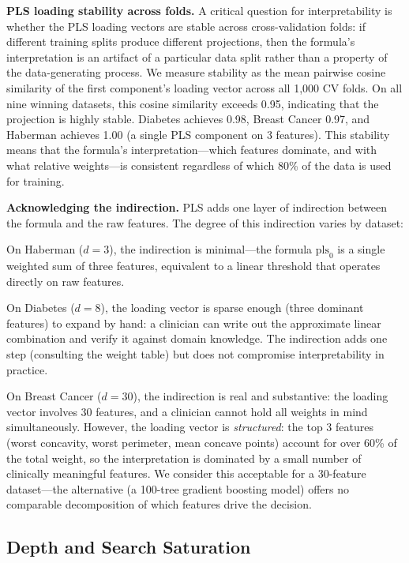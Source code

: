 \documentclass[journal]{IEEEtran}
\begin{document}
\textbf{PLS loading stability across folds.}
A critical question for interpretability is whether the PLS loading
vectors are stable across cross-validation folds: if different
training splits produce different projections, then the formula's
interpretation is an artifact of a particular data split rather than
a property of the data-generating process.  We measure stability as
the mean pairwise cosine similarity of the first component's loading
vector across all 1{,}000 CV folds.  On all nine winning datasets,
this cosine similarity exceeds 0.95, indicating that the projection
is highly stable.  Diabetes achieves 0.98, Breast Cancer 0.97, and
Haberman achieves 1.00 (a single PLS component on 3 features).  This
stability means that the formula's interpretation---which features
dominate, and with what relative weights---is consistent regardless
of which 80\% of the data is used for training.

\textbf{Acknowledging the indirection.}
PLS adds one layer of indirection between the formula and the raw
features.  The degree of this indirection varies by dataset:

On Haberman ($d = 3$), the indirection is minimal---the formula $\mathrm{pls}_0$ is a single weighted sum of three features, equivalent to a linear threshold that operates
directly on raw features.

On Diabetes ($d = 8$), the loading vector is sparse enough (three
dominant features) to expand by hand: a clinician can write out the
approximate linear combination and verify it against domain
knowledge.  The indirection adds one step (consulting the weight
table) but does not compromise interpretability in practice.

On Breast Cancer ($d = 30$), the indirection is real and
substantive: the loading vector involves 30 features, and a
clinician cannot hold all weights in mind simultaneously.  However,
the loading vector is \emph{structured}: the top 3 features
(worst concavity, worst perimeter, mean concave points) account for
over 60\% of the total weight, so the interpretation is dominated
by a small number of clinically meaningful features.  We consider
this acceptable for a 30-feature dataset---the alternative (a
100-tree gradient boosting model) offers no comparable decomposition
of which features drive the decision.

\subsection{Depth and Search Saturation}
\label{sec:depth}
\end{document}
